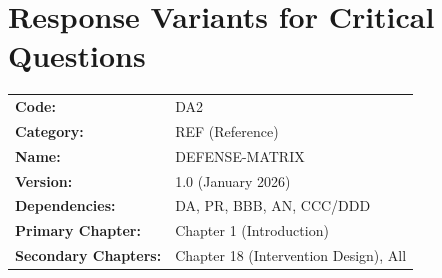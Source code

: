 %
%

\chapter{Response Variants for Critical Questions}
\label{app:DA2}


\begin{tcolorbox}[colback=gray!5!white, colframe=gray!75!black,
    title=Appendix Metadata]
\begin{tabular}{@{}ll@{}}
\textbf{Code:} & DA2 \\
\textbf{Category:} & REF (Reference) \\
\textbf{Name:} & DEFENSE-MATRIX \\
\textbf{Version:} & 1.0 (January 2026) \\
\textbf{Dependencies:} & DA, PR, BBB, AN, CCC/DDD \\
\textbf{Primary Chapter:} & Chapter 1 (Introduction) \\
\textbf{Secondary Chapters:} & Chapter 18 (Intervention Design), All \\
\end{tabular}
\end{tcolorbox}

